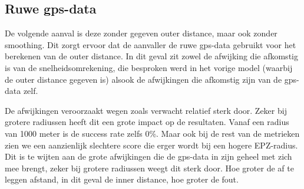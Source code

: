 \subsection{Ruwe gps-data}
De volgende aanval is deze zonder gegeven outer distance, maar ook zonder
smoothing. Dit zorgt ervoor dat de aanvaller de ruwe \ac{gps}-data gebruikt
voor het berekenen van de outer distance. In dit geval zit zowel de afwijking
die afkomstig is van de snelheidsomrekening, die besproken werd in het vorige
model (waarbij de outer distance gegeven is) alsook de afwijkingen die
afkomstig zijn van de \ac{gps}-data zelf.

De afwijkingen veroorzaakt wegen zoals verwacht relatief sterk door. Zeker bij
grotere radiussen heeft dit een grote impact op de resultaten. Vanaf een radius
van 1000 meter is de success rate zelfs 0\%. Maar ook bij de rest van de
metrieken zien we een aanzienlijk slechtere score die erger wordt bij een
hogere \ac{EPZ}-radius. Dit is te wijten aan de grote afwijkingen die de
\ac{gps}-data in zijn geheel met zich mee brengt, zeker bij grotere radiussen
weegt dit sterk door. Hoe groter de af te leggen afstand, in dit geval de inner
distance, hoe groter de fout.
